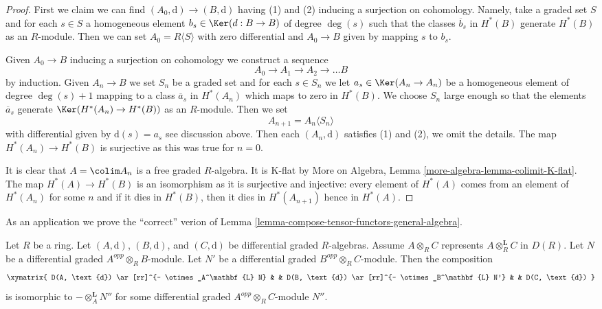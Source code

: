 \begin{proof}
First we claim we can find $(A_0, \text{d}) \to (B, \text{d})$
having (1) and (2) inducing a surjection on cohomology.
Namely, take a graded set $S$ and for each $s \in S$
a homogeneous element $b_s \in \Ker(d : B \to B)$ of degree $\deg(s)$
such that the classes $\overline{b}_s$ in $H^*(B)$
generate $H^*(B)$ as an $R$-module.
Then we can set $A_0 = R\langle S \rangle$ with zero differential
and $A_0 \to B$ given by mapping $s$ to $b_s$.

\medskip\noindent
Given $A_0 \to B$ inducing a surjection on cohomology we construct
a sequence
$$
A_0 \to A_1 \to A_2 \to \ldots B
$$
by induction. Given $A_n \to B$ we set $S_n$ be a graded set
and for each $s \in S_n$ we let $a_s \in \Ker(A_n \to A_n)$
be a homogeneous element of degree $\deg(s) + 1$
mapping to a class $\overline{a}_s$ in $H^*(A_n)$
which maps to zero in $H^*(B)$. We choose $S_n$ large enough
so that the elements $\overline{a}_s$ generate $\Ker(H^*(A_n) \to H^*(B))$
as an $R$-module. Then we set
$$
A_{n + 1} = A_n\langle S_n \rangle
$$
with differential given by $\text{d}(s) = a_s$ see discussion above.
Then each $(A_n, \text{d})$ satisfies (1) and (2), we omit the details.
The map $H^*(A_n) \to H^*(B)$ is surjective as this was true for $n = 0$.

\medskip\noindent
It is clear that $A = \colim A_n$ is a free graded $R$-algebra.
It is K-flat by More on Algebra, Lemma \ref{more-algebra-lemma-colimit-K-flat}.
The map $H^*(A) \to H^*(B)$ is an isomorphism as it is surjective
and injective: every element of $H^*(A)$ comes from an element of
$H^*(A_n)$ for some $n$ and if it dies in $H^*(B)$, then it dies
in $H^*(A_{n + 1})$ hence in $H^*(A)$.
\end{proof}

\noindent
As an application we prove the ``correct'' verion of
Lemma \ref{lemma-compose-tensor-functors-general-algebra}.

\begin{lemma}
\label{lemma-compose-tensor-functors-tor}
Let $R$ be a ring. Let $(A, \text{d})$, $(B, \text{d})$, and
$(C, \text{d})$ be differential graded $R$-algebras. Assume
$A \otimes_R C$ represents $A \otimes^\mathbf{L}_R C$ in $D(R)$.
Let $N$ be a differential graded $A^{opp} \otimes_R B$-module.
Let $N'$ be a differential graded $B^{opp} \otimes_R C$-module.
Then the composition
$$
\xymatrix{
D(A, \text{d}) \ar[rr]^{- \otimes_A^\mathbf{L} N} & &
D(B, \text{d}) \ar[rr]^{- \otimes_B^\mathbf{L} N'} & &
D(C, \text{d})
}
$$
is isomorphic to $- \otimes_A^\mathbf{L} N''$ for some differential graded
$A^{opp} \otimes_R C$-module $N''$.
\end{lemma}

